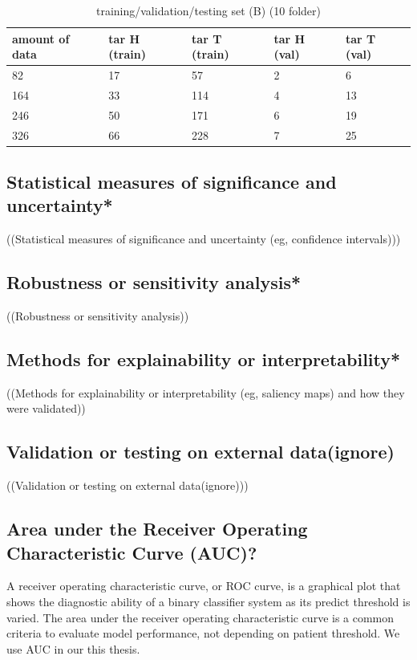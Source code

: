 \begin{table}[H]
\centering
\caption{training/validation/testing set (B) (10 folder)}
\begin{tabular}{|l|l|l|l|l|} 
\hline
amount of data   & tar H (train) & tar T (train) & tar H (val) & tar T (val)  \\ 
\hline
82        & 17      & 57      & 2               & 6               \\ 
\hline
164   & 33       & 114       & 4               & 13               \\ 
\hline
246  & 50       & 171       & 6               & 19               \\ 
\hline
326 & 66        & 228        & 7               & 25              \\
\hline
\end{tabular}
\end{table}

\subsection{Statistical measures of significance and uncertainty*}
((Statistical measures of significance and uncertainty (eg, confidence intervals))) \\
\subsection{Robustness or sensitivity analysis*}
((Robustness or sensitivity analysis)) \\
\subsection{Methods for explainability or interpretability*}
((Methods for explainability or interpretability (eg, saliency maps) and how they were validated)) \\
\subsection{Validation or testing on external data(ignore)}
((Validation or testing on external data(ignore))) \\





\subsection{Area under the Receiver Operating Characteristic Curve (AUC)?}
A receiver operating characteristic curve, or ROC curve, is a graphical plot that shows the diagnostic ability of a binary classifier system as its predict threshold is varied. The area under the receiver operating characteristic curve is a common criteria to evaluate model performance, not depending on patient threshold. We use AUC in our this thesis. 


